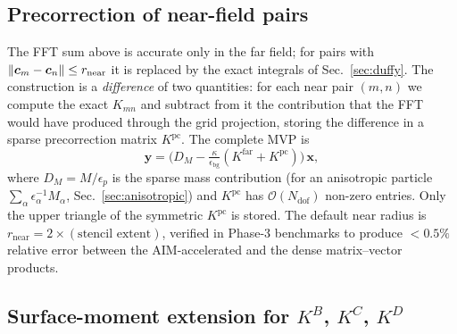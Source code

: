\documentclass[11pt,a4paper]{article}
\begin{document}
\subsection{Precorrection of near-field pairs}
\label{sec:aim-precorrection}

The FFT sum above is accurate only in the far field; for pairs with
$\norm{\bm{c}_m - \bm{c}_n} \le r_{\text{near}}$ it is replaced by the
exact integrals of Sec.~\ref{sec:duffy}. The construction is a
\emph{difference} of two quantities: for each near pair $(m,n)$ we
compute the exact $K_{mn}$ and subtract from it the contribution that
the FFT would have produced through the grid projection, storing the
difference in a sparse precorrection matrix $K^{\text{pc}}$. The
complete MVP is
\begin{equation}
  \bm{y} = \bigl(D_M - \tfrac{\kappa}{\epsilon_{\text{bg}}}
              (K^{\text{far}} + K^{\text{pc}})\bigr)\,\bm{x},
  \label{eq:aim-mvp}
\end{equation}
where $D_M = M/\epsilon_p$ is the sparse mass contribution (for an
anisotropic particle $\sum_\alpha \epsilon_\alpha^{-1} M_\alpha$,
Sec.~\ref{sec:anisotropic}) and $K^{\text{pc}}$ has
$\mathcal{O}(N_{\text{dof}})$ non-zero entries. Only the upper triangle
of the symmetric $K^{\text{pc}}$ is stored. The default near radius
is $r_{\text{near}} = 2 \times (\text{stencil extent})$, verified in
Phase-3 benchmarks to produce $<0.5\%$ relative error between the
AIM-accelerated and the dense matrix--vector products.

\subsection{Surface-moment extension for $K^{B}$, $K^{C}$, $K^{D}$}
\label{sec:aim-surface}
\end{document}
